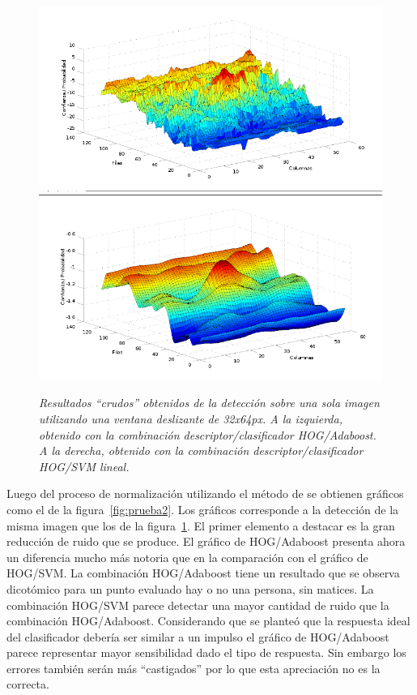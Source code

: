 \begin{figure}[htc]
  \centering
  \includegraphics[scale=.27]{images/raw/boost/prueba}
  \includegraphics[scale=.27]{images/raw/svm/prueba}
  \caption{\em Resultados ``crudos'' obtenidos de la detección sobre una sola imagen utilizando una ventana deslizante de 32x64px. A la izquierda, obtenido con la combinación descriptor/clasificador HOG/Adaboost. A la derecha, obtenido con la combinación descriptor/clasificador HOG/SVM lineal.}  
  \label{fig:prueba1}
\end{figure}

Luego del proceso de normalización utilizando el método de \cite{Platt1999} se obtienen gráficos como el de la figura~\ref{fig:prueba2}. Los gráficos corresponde a la detección de la misma imagen que los de la figura~\ref{fig:prueba1}. El primer elemento a destacar es la gran reducción de ruido que se produce. El gráfico de HOG/Adaboost presenta ahora un diferencia mucho más notoria que en la comparación con el gráfico de HOG/SVM. La combinación HOG/Adaboost tiene un resultado que se observa dicotómico \ie para un punto evaluado hay 
o no una persona, sin matices. La combinación HOG/SVM parece detectar una mayor cantidad de ruido que la combinación HOG/Adaboost. Considerando que se planteó que la respuesta ideal del clasificador debería ser similar a un impulso el gráfico de HOG/Adaboost parece representar mayor sensibilidad dado el tipo de respuesta. Sin embargo los errores también serán más ``castigados'' por lo que esta apreciación no es la correcta.

